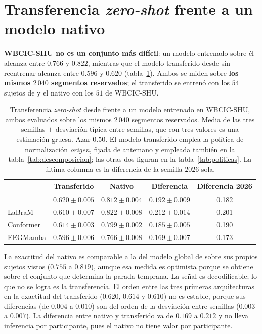 \section{Transferencia \textit{zero-shot} frente a un modelo nativo}

\textbf{WBCIC-SHU no es un conjunto más difícil}: un modelo entrenado sobre él alcanza entre $0.766$ y
$0.822$, mientras que el modelo transferido desde \openbmi{} sin reentrenar alcanza entre $0.596$ y $0.620$
(tabla~\ref{tab:transferencia}). Ambos se miden sobre \textbf{los mismos $2\,040$ segmentos reservados}; el
transferido se entrenó con los $54$ sujetos de \openbmi{} y el nativo con los $51$ de WBCIC-SHU.

\begin{table}[H]
\centering
\caption{Transferencia \textit{zero-shot} desde \openbmi{} frente a un modelo entrenado en
WBCIC-SHU, ambos evaluados sobre los mismos $2\,040$ segmentos reservados. Media de las tres
semillas $\pm$ desviación típica entre semillas, que con tres valores es una estimación gruesa.
Azar $0.50$. El modelo transferido emplea la política de normalización \emph{origen}, fijada de
antemano y empleada también en la tabla~\ref{tab:descomposicion}; las otras dos figuran en la
tabla~\ref{tab:politicas}. La última columna es la diferencia de la semilla $2026$ sola.}
\label{tab:transferencia}
\small
\begin{tabular}{lcccc}
\toprule
 & \textbf{Transferido} & \textbf{Nativo} & \textbf{Diferencia} & Diferencia 2026 \\
\midrule
\eegnet{} & $0.620 \pm 0.005$ & $0.812 \pm 0.004$ & $0.192 \pm 0.009$ & 0.182 \\
LaBraM & $0.610 \pm 0.007$ & $0.822 \pm 0.008$ & $0.212 \pm 0.014$ & 0.201 \\
Conformer & $0.614 \pm 0.003$ & $0.799 \pm 0.002$ & $0.185 \pm 0.005$ & 0.190 \\
EEGMamba & $0.596 \pm 0.006$ & $0.766 \pm 0.008$ & $0.169 \pm 0.007$ & 0.173 \\
\bottomrule
\end{tabular}
\end{table}

La exactitud del nativo es comparable a la del modelo global de \openbmi{} sobre sus propios sujetos vistos
($0.755$ a $0.819$), aunque esa medida es optimista porque se obtiene sobre el conjunto que determina la
parada temprana. La señal es decodificable; lo que no se logra es la transferencia. El orden entre las tres
primeras arquitecturas en la exactitud del transferido ($0.620$, $0.614$ y $0.610$) no es estable, porque sus
diferencias (de $0.004$ a $0.010$) son del orden de la desviación entre semillas ($0.003$ a $0.007$). La
diferencia entre nativo y transferido va de $0.169$ a $0.212$ y no lleva inferencia por participante, pues el
nativo no tiene valor por participante.

